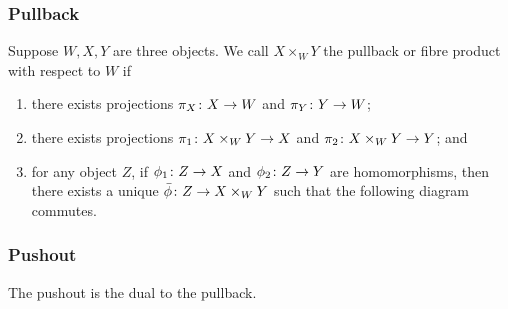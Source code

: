 \subsubsection*{Pullback}

\begin{definition}
    Suppose \(W,X,Y\) are three objects.
    We call \(X \times_W Y\) the pullback or fibre product with respect to \(W\) if
    \begin{enumerate}[label={(\roman*)}, itemsep=0mm]
        \item there exists projections \(\pi_X\colon X\to W\) and \(\pi_Y\colon Y\to W\);
        \item there exists projections \(\pi_1\colon X \times_W Y\to X\)
            and \(\pi_2\colon X \times_W Y\to Y\); and
        \item for any object \(Z\),
            if \(\phi_1\colon Z\to X\) and \(\phi_2\colon Z\to Y\) are homomorphisms,
            then there exists a unique \(\bar{\phi}\colon Z\to X \times_W Y\)
            such that the following diagram commutes.
    \end{enumerate}
    \begin{center}
    \end{center}
\end{definition}

\subsubsection*{Pushout}

\begin{remark}
    The pushout is the dual to the pullback.
\end{remark}

